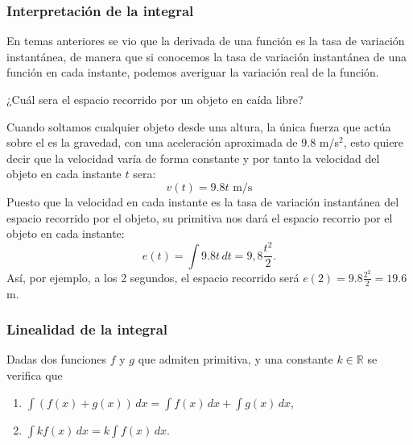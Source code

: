 \begin{frame}
	\frametitle{Interpretación de la integral}
	En temas anteriores se vio que la derivada de una función es la tasa de variación instantánea, de manera que si
	conocemos la tasa de variación instantánea de una función en cada instante, podemos averiguar la variación real de la
	función. 
	
	 ¿Cuál sera el espacio recorrido por un objeto en caída libre?
	
	Cuando soltamos cualquier objeto desde una altura, la única fuerza que actúa sobre el es la gravedad, con una
	aceleración aproximada de $9.8$ m/s$^2$, esto quiere decir que la velocidad varía de forma constante y por tanto la
	velocidad del objeto en cada instante $t$ sera: 
	\[
		v(t) = 9.8t  \mbox{ m/s}
	\] 
	Puesto que la velocidad en cada instante es la tasa de variación instantánea del espacio recorrido por el objeto, su
	primitiva nos dará el espacio recorrio por el objeto en cada instante: 
	\[
		e(t) = \int 9.8t\, dt = 9,8\frac{t^2}{2}.
	\]
	Así, por ejemplo, a los 2 segundos, el espacio recorrido será $e(2) = 9.8\frac{2^2}{2} = 19.6$ m.
\end{frame}


\begin{frame}
	\frametitle{Linealidad de la integral}
	Dadas dos funciones $f$ y $g$ que admiten primitiva, y una constante $k \in \mathbb{R}$ se verifica que
	\begin{enumerate}
		\item $\int{(f(x)+g(x))}\,dx=\int{f(x)}\,dx+\int{g(x)}\,dx$,
		      
		\item $\int{kf(x)}\,dx=k\int{f(x)}\,dx$.
	\end{enumerate}
\end{frame}


